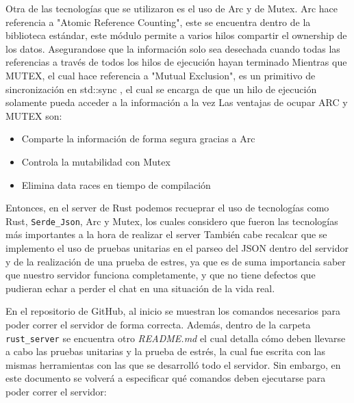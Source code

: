 Otra de las tecnologías que se utilizaron es el uso de Arc y de Mutex.
Arc hace referencia a "Atomic Reference Counting", este se encuentra dentro de la biblioteca estándar, este módulo permite a varios hilos compartir el ownership de los datos. Asegurandose que la información solo sea desechada cuando todas las referencias a través de todos los hilos de ejecución hayan terminado
Mientras que MUTEX, el cual hace referencia a "Mutual Exclusion", es un primitivo de sincronización en std::sync , el cual se encarga de que un hilo de ejecución solamente pueda acceder a la información a la vez
Las ventajas de ocupar ARC y MUTEX son: 

\begin{itemize}
    \item Comparte la información de forma segura gracias a Arc
    \item Controla la mutabilidad con Mutex 
    \item Elimina data races en tiempo de compilación 
\end{itemize}

Entonces, en el server de Rust podemos recueprar el uso de tecnologías como Rust, \texttt{Serde\_Json}, Arc y Mutex, los cuales considero que fueron las tecnologías más importantes a la hora de realizar el server
También cabe recalcar que se implemento el uso de pruebas unitarias en el parseo del JSON dentro del servidor y de la realización de una prueba de estres, ya que es de suma importancia saber que nuestro servidor funciona completamente, y que no tiene defectos que pudieran echar a perder el chat en una situación de la vida real.

En el repositorio de GitHub, al inicio se muestran los comandos necesarios para poder correr el servidor de forma correcta. Además, dentro de la carpeta \texttt{rust\_server} se encuentra otro \textit{README.md} el cual detalla cómo deben llevarse a cabo las pruebas unitarias y la prueba de estrés, la cual fue escrita con las mismas herramientas con las que se desarrolló todo el servidor.
Sin embargo, en este documento se volverá a especificar qué comandos deben ejecutarse para poder correr el servidor:

